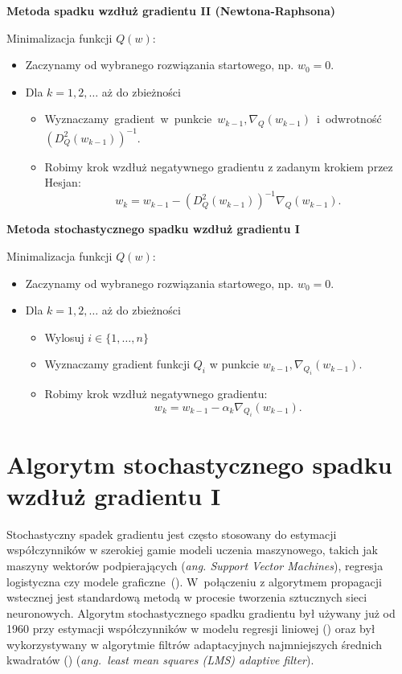 \begin{center}
\textbf{Metoda spadku wzdłuż gradientu II (Newtona-Raphsona)}
\end{center}
Minimalizacja funkcji $Q(w)$:
\begin{itemize}
\item Zaczynamy od wybranego rozwiązania startowego, np. $w_{0} = 0$.
\item Dla $k = 1, 2, \dots$ aż do zbieżności
	\begin{itemize}
	\item Wyznaczamy~gradient~w~punkcie~$w_{k-1}, \nabla_{Q}(w_{k-1})$~i~odwrotność~$(D_{Q}^{2}(w_{k-1}))^{-1}$.
	\item Robimy krok wzdłuż negatywnego gradientu z zadanym krokiem przez Hesjan: 
	\begin{equation}\label{NJU-rap}
	 w_{k} = w_{k-1} - (D_{Q}^{2}(w_{k-1}))^{-1}\nabla_{Q}(w_{k-1}). 
	 \end{equation}	
	\end{itemize}
\end{itemize}
\begin{center}
\textbf{Metoda stochastycznego spadku wzdłuż gradientu I}
\end{center}
Minimalizacja funkcji $Q(w)$:
\begin{itemize}
\item Zaczynamy od wybranego rozwiązania startowego, np. $w_{0} = 0$.
\item Dla $k = 1, 2, \dots$ aż do zbieżności
	\begin{itemize}
	\item Wylosuj $i \in \{1,\dots,n\}$
	\item Wyznaczamy gradient funkcji $Q_{i}$ w punkcie $w_{k-1}, \nabla_{Q_{i}}(w_{k-1})$.
	\item Robimy krok wzdłuż negatywnego gradientu: 
	\begin{equation}\label{sgdrownanie}
	 w_{k} = w_{k-1} - \alpha_{k}\nabla_{Q_{i}}(w_{k-1}).
	  \end{equation}
	\end{itemize}
\end{itemize}

\section{Algorytm stochastycznego spadku wzdłuż gradientu I}\label{SGD}
\vspace{-5pt}
Stochastyczny spadek gradientu jest często stosowany do estymacji współczynników w szerokiej gamie modeli uczenia maszynowego, takich jak maszyny wektorów podpierających (\textit{ang. Support Vector Machines}), regresja logistyczna czy modele graficzne~(\cite{finkel}). W~połączeniu z algorytmem propagacji wstecznej jest standardową metodą w procesie tworzenia sztucznych sieci neuronowych. Algorytm stochastycznego spadku gradientu był używany już od 1960 przy estymacji współczynników w modelu regresji liniowej (\cite{ADALINE}) oraz był  wykorzystywany w algorytmie filtrów adaptacyjnych najmniejszych średnich kwadratów (\cite{widrow2}) (\textit{ang.~least mean squares (LMS) adaptive filter}).

